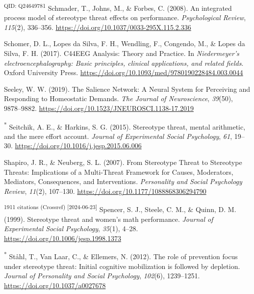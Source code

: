 \documentclass[
  stu, a4paper,floatsintext]{apa7}
\newlength{\cslhangindent}
\newenvironment{CSLReferences}[2] %
 {\begin{list}{}{%
  \setlength{\itemindent}{0pt}
  \setlength{\leftmargin}{0pt}
  \setlength{\parsep}{0pt}
  \ifodd #1
   \setlength{\leftmargin}{\cslhangindent}
   \setlength{\itemindent}{-1\cslhangindent}
  \fi
  \setlength{\itemsep}{#2\baselineskip}}}
 {\end{list}}
\begin{document}
\begin{CSLReferences}{1}{0}
\textsuperscript{QID: Q24649781} Schmader, T., Johns, M., \& Forbes, C. (2008). An integrated process model of stereotype threat effects on performance. \emph{Psychological Review}, \emph{115}(2), 336--356. \url{https://doi.org/10.1037/0033-295X.115.2.336}

Schomer, D. L., Lopes da Silva, F. H., Wendling, F., Congendo, M., \& Lopes da Silva, F. H. (2017). {C44EEG Analysis}: {Theory} and {Practice}. In \emph{Niedermeyer's electroencephalography: {Basic} principles, clinical applications, and related fields}. Oxford University Press. \url{https://doi.org/10.1093/med/9780190228484.003.0044}

Seeley, W. W. (2019). The {Salience Network}: {A Neural System} for {Perceiving} and {Responding} to {Homeostatic Demands}. \emph{The Journal of Neuroscience}, \emph{39}(50), 9878--9882. \url{https://doi.org/10.1523/JNEUROSCI.1138-17.2019}

\textsuperscript{*} Seitchik, A. E., \& Harkins, S. G. (2015). Stereotype threat, mental arithmetic, and the mere effort account. \emph{Journal of Experimental Social Psychology}, \emph{61}, 19--30. \url{https://doi.org/10.1016/j.jesp.2015.06.006}

Shapiro, J. R., \& Neuberg, S. L. (2007). From {Stereotype Threat} to {Stereotype Threats}: {Implications} of a {Multi-Threat Framework} for {Causes}, {Moderators}, {Mediators}, {Consequences}, and {Interventions}. \emph{Personality and Social Psychology Review}, \emph{11}(2), 107--130. \url{https://doi.org/10.1177/1088868306294790}

\textsuperscript{1911 citations (Crossref) {[}2024-06-23{]}} Spencer, S. J., Steele, C. M., \& Quinn, D. M. (1999). Stereotype threat and women's math performance. \emph{Journal of Experimental Social Psychology}, \emph{35}(1), 4--28. \url{https://doi.org/10.1006/jesp.1998.1373}

\textsuperscript{*} Ståhl, T., Van Laar, C., \& Ellemers, N. (2012). The role of prevention focus under stereotype threat: {Initial} cognitive mobilization is followed by depletion. \emph{Journal of Personality and Social Psychology}, \emph{102}(6), 1239--1251. \url{https://doi.org/10.1037/a0027678}


\end{CSLReferences}
\end{document}
